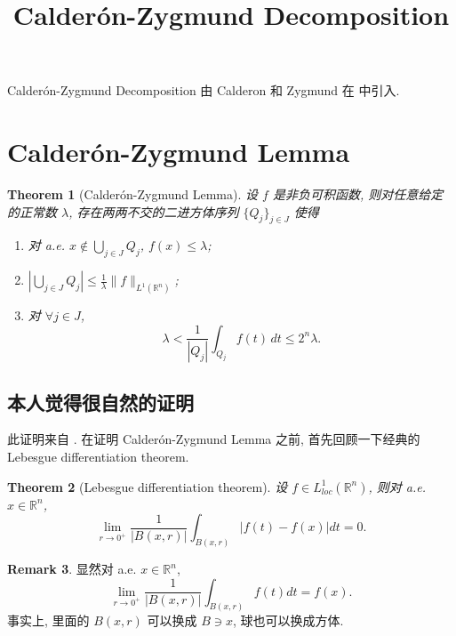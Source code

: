 \documentclass[a4paper,11pt]{article}
\title{Calder\'on-Zygmund Decomposition}
\newtheorem{theorem}{Theorem}[section]
\theoremstyle{definition}
\newtheorem{remark}[theorem]{Remark}
\begin{document}
\begin{CJK*}{UTF8}{gbsn}

\maketitle

Calder\'on-Zygmund Decomposition 由 Calderon 和 Zygmund 在 \cite{cz52} 中引入.

\section{Calder\'on-Zygmund Lemma}

\begin{theorem}[Calder\'on-Zygmund Lemma] \label{C-Z lemma}
    设 $ f $ 是非负可积函数, 则对任意给定的正常数 $ \lambda $, 存在两两不交的二进方体序列 $ \{Q_j\}_{j \in J} $ 
    使得
    \begin{enumerate}[{\rm(i)}]
        \item 对 a.e. $ x \notin \bigcup_{j \in J} Q_j $, $ f(x) \leq \lambda $;
        \item $ | \bigcup_{j \in J} Q_j | \leq \frac{1}{\lambda} \| f \|_{L^1(\mathbb{R}^n)} $;
        \item 对 $ \forall j \in J $, 
            $$
                \lambda < \frac{1}{|Q_j|} \int_{Q_j} f(t) \, dt \leq 2^n \lambda.
            $$
    \end{enumerate}
\end{theorem}

\subsection{本人觉得很自然的证明}

此证明来自 \cite[Lemma 1.2]{kk13}. 
在证明 Calder\'on-Zygmund Lemma 之前, 首先回顾一下经典的 Lebesgue differentiation theorem.

\begin{theorem}[Lebesgue differentiation theorem]
    设 $ f \in L^1_{loc}(\mathbb{R}^n) $, 则对 a.e. $ x \in \mathbb{R}^n $, 
    $$
        \lim_{r \to 0^+} \frac{1}{|B(x, r)|} \int_{B(x, r)} |f(t) - f(x)| dt = 0.
    $$
\end{theorem}

\begin{remark}
    显然对 a.e. $ x \in \mathbb{R}^n $,
    $$
        \lim_{r \to 0^+} \frac{1}{|B(x, r)|} \int_{B(x, r)} f(t) dt = f(x).
    $$
    事实上, 里面的 $ B(x, r) $ 可以换成 $ B \ni x $, 球也可以换成方体.
\end{remark}


\end{CJK*}
\end{document}
